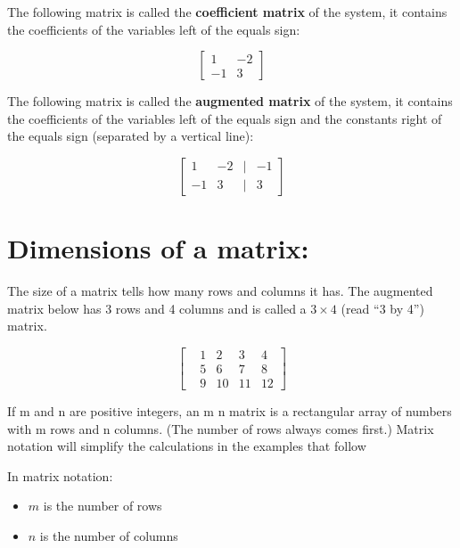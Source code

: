 \documentclass[
  letterpaper,
  DIV=11,
  numbers=noendperiod]{scrreprt}
\providecommand{\tightlist}{%
  \setlength{\itemsep}{0pt}\setlength{\parskip}{0pt}}\usepackage{longtable,booktabs,array}
\begin{document}
The following matrix is called the \textbf{coefficient matrix} of the
system, it contains the coefficients of the variables left of the equals
sign:

\[
\begin{bmatrix}
1 & -2\\
-1 & 3
\end{bmatrix}
\]

The following matrix is called the \textbf{augmented matrix} of the
system, it contains the coefficients of the variables left of the equals
sign and the constants right of the equals sign (separated by a vertical
line):

\[
\begin{bmatrix}
1 & -2 &|& -1\\
-1 & 3 &|& 3
\end{bmatrix}
\]

\hypertarget{dimensions-of-a-matrix}{%
\section*{Dimensions of a matrix:}\label{dimensions-of-a-matrix}}


The size of a matrix tells how many rows and columns it has. The
augmented matrix below has 3 rows and 4 columns and is called a
\(3 \times 4\) (read ``3 by 4'') matrix.

\[
\begin{bmatrix}
&1 &2 &3 &4\\
&5 &6 &7 &8\\
&9 &10 &11 &12
\end{bmatrix}
\]

If m and n are positive integers, an m n matrix is a rectangular array
of numbers with m rows and n columns. (The number of rows always comes
first.) Matrix notation will simplify the calculations in the examples
that follow

\begin{tcolorbox}[enhanced jigsaw, leftrule=.75mm, opacityback=0, title=\textcolor{quarto-callout-tip-color}{\faLightbulb}\hspace{0.5em}{Tip}, coltitle=black, breakable, colbacktitle=quarto-callout-tip-color!10!white, colframe=quarto-callout-tip-color-frame, toprule=.15mm, bottomtitle=1mm, arc=.35mm, toptitle=1mm, opacitybacktitle=0.6, bottomrule=.15mm, rightrule=.15mm, titlerule=0mm, colback=white, left=2mm]

In matrix notation:

\begin{itemize}
\tightlist
\item
  \(m\) is the number of rows
\item
  \(n\) is the number of columns
\end{itemize}

\end{tcolorbox}
\end{document}
